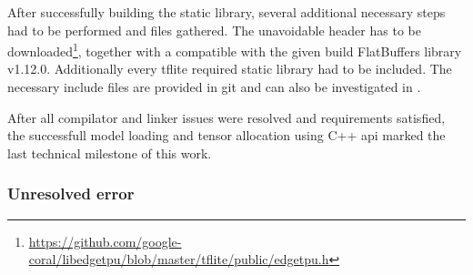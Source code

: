 {After successfully building the static  library, several additional necessary steps had to be performed and files gathered.
The unavoidable  header has to be downloaded\footnote{\url{https://github.com/google-coral/libedgetpu/blob/master/tflite/public/edgetpu.h}},
together with a compatible with the given build FlatBuffers library v1.12.0. Additionally every \gls{tflite} required static library had to be included.
The necessary include files are provided in git and can also be investigated in .

After all compilator and linker issues were resolved and requirements satisfied, the successfull model loading and tensor allocation using C++ \gls{api}
marked the last technical milestone of this work.

\subsubsection*{Unresolved error}

}
